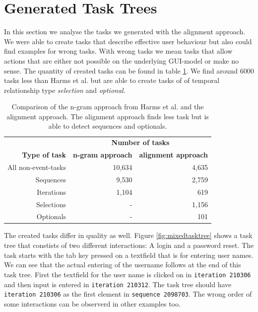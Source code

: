 \section{Generated Task Trees}
In this section we analyse the tasks we generated with the alignment approach. 
We were able to create tasks that describe effective user behaviour but also could find examples for wrong tasks.
With wrong tasks we mean tasks that allow actions that are either not possible on the underlying GUI-model or make no sense.
The quantity of created tasks can be found in table \ref{tab:taskquantity}. 
We find around 6000 tasks less than Harms et al. but are able to create tasks of of temporal relationship type \textit{selection} and \textit{optional}.

\begin{table}
	\centering
	\begin{tabular}{ r r r }
	   \toprule
	    & \multicolumn{2}{c}{\textbf{Number of tasks}} \\
		\cmidrule{2-3}
		\textbf{Type of task}& \textbf{n-gram approach} & \textbf{alignment approach} \\
	   \midrule
	   All non-event-tasks 	& 10,634 			& 4,635 \\
		\midrule
	   Sequences 				& 9,530 				& 2,759 \\
	   Iterations 				& 1,104 				& 619 \\
	   Selections 				& -\hspace{12pt}	& 1,156 \\
	   Optionals 				& -\hspace{12pt} 	& 101 \\
	   \bottomrule
\end{tabular}
\caption{Comparison of the n-gram approach from Harms et al. and the alignment approach. The alignment approach finds less task but is able to detect sequences and optionals.}
\label{tab:taskquantity}
\end{table}

The created tasks differ in quality as well. 
Figure \ref{fig:mixedtasktree} shows a task tree that constists of two different interactions: A login and a password reset.
The task starts with the tab key pressed on a textfield that is for entering user names. 
We can see that the actual entering of the username follows at the end of this task tree. 
First the textfield for the user name is clicked on in \texttt{iteration 210306} and then input is entered in \texttt{iteration 210312}. 
The task tree should have \texttt{iteration 210306} as the first element in \texttt{sequence 2098703}.
The wrong order of some interactions can be observerd in other examples too.  

